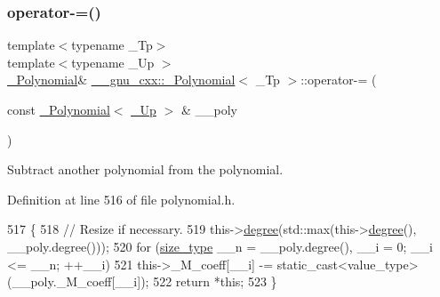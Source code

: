 \subsubsection{\texorpdfstring{operator-\/=()}{operator-=()}\hspace{0.1cm}{\footnotesize\ttfamily [2/2]}}
{\footnotesize\ttfamily template$<$typename \+\_\+\+Tp$>$ \\
template$<$typename \+\_\+\+Up $>$ \\
\hyperlink{class____gnu__cxx_1_1__Polynomial}{\+\_\+\+Polynomial}\& \hyperlink{class____gnu__cxx_1_1__Polynomial}{\+\_\+\+\_\+gnu\+\_\+cxx\+::\+\_\+\+Polynomial}$<$ \+\_\+\+Tp $>$\+::operator-\/= (\begin{DoxyParamCaption}\item[{const \hyperlink{class____gnu__cxx_1_1__Polynomial}{\+\_\+\+Polynomial}$<$ \hyperlink{class____gnu__cxx_1_1__Polynomial_a242114d4b86648a5dff67a8221f80d40}{\+\_\+\+Up} $>$ \&}]{\+\_\+\+\_\+poly }\end{DoxyParamCaption})\hspace{0.3cm}{\ttfamily [inline]}}

Subtract another polynomial from the polynomial. 

Definition at line 516 of file polynomial.\+h.


\begin{DoxyCode}
517         \{
518           \textcolor{comment}{// Resize if necessary.}
519           this->\hyperlink{class____gnu__cxx_1_1__Polynomial_a07d9933aeeb9afbd823218ed921336cb}{degree}(std::max(this->\hyperlink{class____gnu__cxx_1_1__Polynomial_a07d9933aeeb9afbd823218ed921336cb}{degree}(), \_\_poly.degree()));
520           \textcolor{keywordflow}{for} (\hyperlink{class____gnu__cxx_1_1__Polynomial_a6afe219c123c7a2fdc5abac8a6639053}{size\_type} \_\_n = \_\_poly.degree(), \_\_i = 0; \_\_i <= \_\_n; ++\_\_i)
521             this->\_M\_coeff[\_\_i] -= static\_cast<value\_type>(\_\_poly.\_M\_coeff[\_\_i]);
522           \textcolor{keywordflow}{return} *\textcolor{keyword}{this};
523         \}
\end{DoxyCode}
\mbox{\label{class____gnu__cxx_1_1__Polynomial_a3fbb600980f4945af2733c9e10228079}} 
